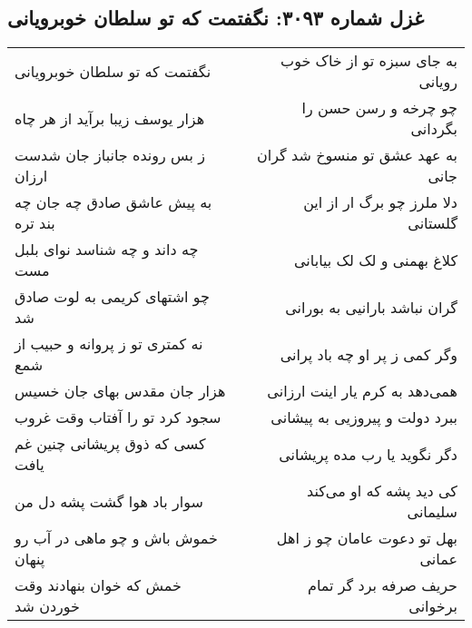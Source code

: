 \begin{center}
\section*{غزل شماره ۳۰۹۳: نگفتمت که تو سلطان خوبرویانی}
\label{sec:3093}
\begin{longtable}{l p{0.5cm} r}
نگفتمت که تو سلطان خوبرویانی
&&
به جای سبزه تو از خاک خوب رویانی
\\
هزار یوسف زیبا برآید از هر چاه
&&
چو چرخه و رسن حسن را بگردانی
\\
ز بس رونده جانباز جان شدست ارزان
&&
به عهد عشق تو منسوخ شد گران جانی
\\
به پیش عاشق صادق چه جان چه بند تره
&&
دلا ملرز چو برگ ار از این گلستانی
\\
چه داند و چه شناسد نوای بلبل مست
&&
کلاغ بهمنی و لک لک بیابانی
\\
چو اشتهای کریمی به لوت صادق شد
&&
گران نباشد بارانیی به بورانی
\\
نه کمتری تو ز پروانه و حبیب از شمع
&&
وگر کمی ز پر او چه باد پرانی
\\
هزار جان مقدس بهای جان خسیس
&&
همی‌دهد به کرم یار اینت ارزانی
\\
سجود کرد تو را آفتاب وقت غروب
&&
ببرد دولت و پیروزیی به پیشانی
\\
کسی که ذوق پریشانی چنین غم یافت
&&
دگر نگوید یا رب مده پریشانی
\\
سوار باد هوا گشت پشه دل من
&&
کی دید پشه که او می‌کند سلیمانی
\\
خموش باش و چو ماهی در آب رو پنهان
&&
بهل تو دعوت عامان چو ز اهل عمانی
\\
خمش که خوان بنهادند وقت خوردن شد
&&
حریف صرفه برد گر تمام برخوانی
\\
\end{longtable}
\end{center}
